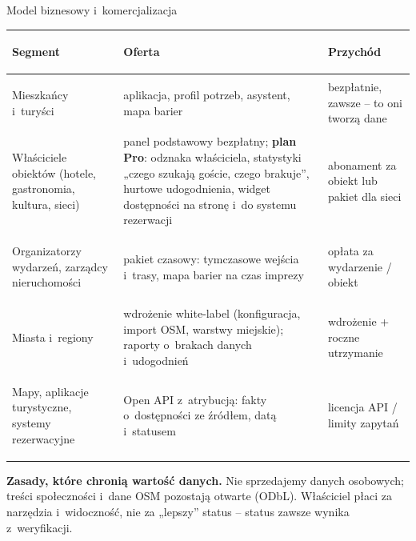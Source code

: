 \begin{frame}{Model biznesowy i~komercjalizacja}
  \footnotesize
  \renewcommand{\arraystretch}{1.1}
  \begin{tabularx}{\textwidth}{@{}>{\bfseries\raggedright\arraybackslash}p{3.1cm} X >{\raggedright\arraybackslash}p{3.4cm}@{}}
    \toprule
    Segment & Oferta & Przychód \\
    \midrule
    Mieszkańcy i~turyści & aplikacja, profil potrzeb, asystent, mapa barier & bezpłatnie, zawsze -- to oni tworzą dane \\
    Właściciele obiektów (hotele, gastronomia, kultura, sieci) & panel podstawowy bezpłatny; \textbf{plan Pro}:
      odznaka właściciela, statystyki „czego szukają goście, czego brakuje”, hurtowe udogodnienia,
      widget dostępności na stronę i~do systemu rezerwacji & abonament za obiekt lub pakiet dla sieci \\
    Organizatorzy wydarzeń, zarządcy nieruchomości & pakiet czasowy: tymczasowe wejścia i~trasy, mapa barier
      na czas imprezy & opłata za wydarzenie / obiekt \\
    Miasta i~regiony & wdrożenie white-label (konfiguracja, import OSM, warstwy miejskie); raporty
      o~brakach danych i~udogodnień & wdrożenie + roczne utrzymanie \\
    Mapy, aplikacje turystyczne, systemy rezerwacyjne & Open API z~atrybucją: fakty o~dostępności
      ze źródłem, datą i~statusem & licencja API / limity zapytań \\
    \bottomrule
  \end{tabularx}

  \vspace{1mm}
  \textbf{Zasady, które chronią wartość danych.} Nie sprzedajemy danych osobowych; treści społeczności i~dane OSM
  pozostają otwarte (ODbL). Właściciel płaci za narzędzia i~widoczność, nie za „lepszy” status -- status zawsze wynika
  z~weryfikacji.

\end{frame}
